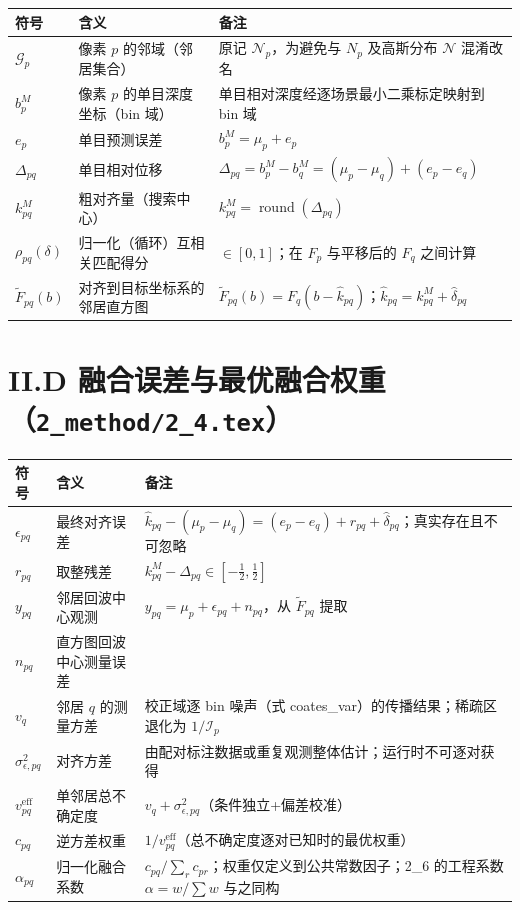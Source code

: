 \documentclass[11pt]{ctexart}
\begin{document}
\begin{center}
\begin{tabular}{@{}llp{}@{}}
\toprule
符号 & 含义 & 备注 \\
\midrule
$\mathcal{G}_p$ & 像素 $p$ 的邻域（邻居集合） & 原记 $\mathcal{N}_p$，为避免与 $N_p$ 及高斯分布 $\mathcal{N}$ 混淆改名 \\
$b_p^M$ & 像素 $p$ 的单目深度坐标（bin 域） & 单目相对深度经逐场景最小二乘标定映射到 bin 域 \\
$e_p$ & 单目预测误差 & $b_p^M=\mu_p+e_p$ \\
$\Delta_{pq}$ & 单目相对位移 & $\Delta_{pq}=b_p^M-b_q^M=(\mu_p-\mu_q)+(e_p-e_q)$ \\
$k_{pq}^{M}$ & 粗对齐量（搜索中心） & $k_{pq}^{M}=\operatorname{round}(\Delta_{pq})$ \\
$\rho_{pq}(\delta)$ & 归一化（循环）互相关匹配得分 & $\in[0,1]$；在 $F_p$ 与平移后的 $F_q$ 之间计算 \\
$\widetilde F_{pq}(b)$ & 对齐到目标坐标系的邻居直方图 & $\widetilde F_{pq}(b)=F_q(b-\hat k_{pq})$；$\hat k_{pq}=k_{pq}^{M}+\hat\delta_{pq}$ \\
\bottomrule
\end{tabular}
\end{center}

\section*{II.D 融合误差与最优融合权重（\texttt{2\_method/2\_4.tex}）}

\begin{center}
\begin{tabular}{@{}llp{}@{}}
\toprule
符号 & 含义 & 备注 \\
\midrule
$\epsilon_{pq}$ & 最终对齐误差 & $\hat k_{pq}-(\mu_p-\mu_q)=(e_p-e_q)+r_{pq}+\hat\delta_{pq}$；真实存在且不可忽略 \\
$r_{pq}$ & 取整残差 & $k_{pq}^{M}-\Delta_{pq}\in[-\tfrac12,\tfrac12]$ \\
$y_{pq}$ & 邻居回波中心观测 & $y_{pq}=\mu_p+\epsilon_{pq}+n_{pq}$，从 $\widetilde F_{pq}$ 提取 \\
$n_{pq}$ & 直方图回波中心测量误差 & \\
$v_q$ & 邻居 $q$ 的测量方差 & 校正域逐 bin 噪声（式 coates\_var）的传播结果；稀疏区退化为 $1/\mathcal I_p$ \\
$\sigma_{\epsilon,pq}^2$ & 对齐方差 & 由配对标注数据或重复观测整体估计；运行时不可逐对获得 \\
$v_{pq}^{\mathrm{eff}}$ & 单邻居总不确定度 & $v_q+\sigma_{\epsilon,pq}^2$（条件独立+偏差校准） \\
$c_{pq}$ & 逆方差权重 & $1/v_{pq}^{\mathrm{eff}}$（总不确定度逐对已知时的最优权重） \\
$\alpha_{pq}$ & 归一化融合系数 & $c_{pq}/\sum_r c_{pr}$；权重仅定义到公共常数因子；2\_6 的工程系数 $\alpha=w/\sum w$ 与之同构 \\
\bottomrule
\end{tabular}
\end{center}
\end{document}
